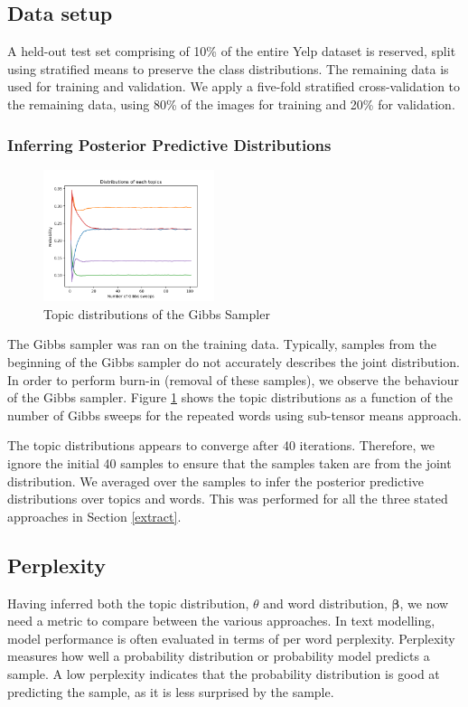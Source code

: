 \documentclass{article}
\begin{document}
\subsection{Data setup}
A held-out test set comprising of 10\% of the entire Yelp dataset is reserved, split using stratified means to preserve the class distributions. The remaining data is used for training and validation. We apply a five-fold stratified cross-validation to the remaining data, using 80\% of the images for training and 20\% for validation. 

\subsubsection{Inferring Posterior Predictive Distributions}

\begin{figure}
  \includegraphics[width=5cm]{convergence.png}
  \caption{Topic distributions of the Gibbs Sampler}
  \label{convergence}
\end{figure}

The Gibbs sampler was ran on the training data. Typically, samples from the beginning of the Gibbs sampler do not accurately describes the joint distribution. In order to perform burn-in (removal of these samples), we observe the behaviour of the Gibbs sampler. Figure \ref{convergence} shows the topic distributions as a function of the number of Gibbs sweeps for the repeated words using sub-tensor means approach. 

The topic distributions appears to converge after 40 iterations. Therefore, we ignore the initial 40 samples to ensure that the samples taken are from the joint distribution. We averaged over the samples to infer the posterior predictive distributions over topics and words. This was performed for all the three stated approaches in Section \ref{extract}.

\subsection{Perplexity}
Having inferred both the topic distribution, $\theta$ and word distribution, $\bm{\beta}$, we now need a metric to compare between the various approaches. In text modelling, model performance is often evaluated in terms of per word perplexity. Perplexity measures how well a probability distribution or probability model predicts a sample. A low perplexity indicates that the probability distribution is good at predicting the sample, as it is less surprised by the sample.  
\end{document}
